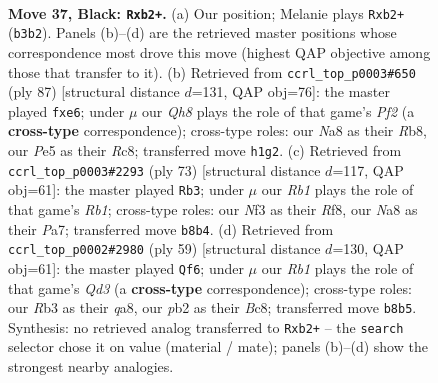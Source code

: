 \documentclass[11pt]{article}
\begin{document}
\clearpage

\begin{figure}[p]\centering
\begin{subfigure}{0.46\textwidth}\centering
\resizebox{\linewidth}{!}{%
\newchessgame
\chessboard[
  setfen={nr4k1/Q4pb1/R7/4p3/4P3/1r2Bn2/1P2KRN1/1N5q b - - 5 37},
  showmover=false,
  pgfstyle=straightmove, color=movearrow, markmove={b3-b2}
]}
\caption{}
\end{subfigure}\hfill
\begin{subfigure}{0.46\textwidth}\centering
\resizebox{\linewidth}{!}{%
\newchessgame
\chessboard[
  setfen={1rrq2k1/5pp1/2bQR2p/3n4/1P1P4/5BR1/3B1P2/6K1 b - - 0 44},
  showmover=false,
  pgfstyle=straightmove, color=movearrow, markmove={f7-e6}
]}
\caption{}
\end{subfigure}
\\[4pt]
\begin{subfigure}{0.46\textwidth}\centering
\resizebox{\linewidth}{!}{%
\newchessgame
\chessboard[
  setfen={1r3r1k/p1Q1q2p/P2nB3/3Pb3/4p3/6P1/3B2K1/2R4R b - - 2 37},
  showmover=false,
  pgfstyle=straightmove, color=movearrow, markmove={b8-b3}
]}
\caption{}
\end{subfigure}\hfill
\begin{subfigure}{0.46\textwidth}\centering
\resizebox{\linewidth}{!}{%
\newchessgame
\chessboard[
  setfen={Q1b2r1k/7p/3q2p1/3Q2p1/3b4/6P1/4Bn1P/5RK1 b - - 2 30},
  showmover=false,
  pgfstyle=straightmove, color=movearrow, markmove={d6-f6}
]}
\caption{}
\end{subfigure}
\caption{\textbf{Move 37, Black: \texttt{Rxb2+}.} (a) Our position; Melanie plays \texttt{Rxb2+} (\texttt{b3b2}). Panels (b)--(d) are the retrieved master positions whose correspondence most drove this move (highest QAP objective among those that transfer to it). (b) Retrieved from \texttt{ccrl\_top\_p0003\#650} (ply 87) [structural distance $d$=131, QAP obj=76]: the master played \texttt{fxe6}; under $\mu$ our \emph{Qh8} plays the role of that game's \emph{Pf2} (a \textbf{cross-type} correspondence); cross-type roles: our \emph{N}a8 as their \emph{R}b8, our \emph{P}e5 as their \emph{R}c8; transferred move \texttt{h1g2}. (c) Retrieved from \texttt{ccrl\_top\_p0003\#2293} (ply 73) [structural distance $d$=117, QAP obj=61]: the master played \texttt{Rb3}; under $\mu$ our \emph{Rb1} plays the role of that game's \emph{Rb1}; cross-type roles: our \emph{N}f3 as their \emph{R}f8, our \emph{N}a8 as their \emph{P}a7; transferred move \texttt{b8b4}. (d) Retrieved from \texttt{ccrl\_top\_p0002\#2980} (ply 59) [structural distance $d$=130, QAP obj=61]: the master played \texttt{Qf6}; under $\mu$ our \emph{Rb1} plays the role of that game's \emph{Qd3} (a \textbf{cross-type} correspondence); cross-type roles: our \emph{R}b3 as their \emph{q}a8, our \emph{p}b2 as their \emph{B}c8; transferred move \texttt{b8b5}. Synthesis: no retrieved analog transferred to \texttt{Rxb2+} -- the \texttt{search} selector chose it on value (material / mate); panels (b)--(d) show the strongest nearby analogies.}
\label{fig:thought-m73}
\end{figure}
\end{document}
